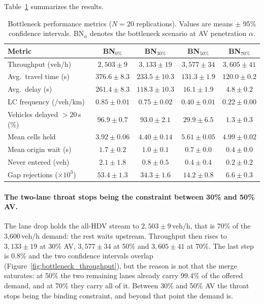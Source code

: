 \documentclass[review,authoryear]{elsarticle}
\begin{document}
Table~\ref{tab:results_bottleneck} summarizes the results.

\begin{table}[ht]
\centering
\caption{Bottleneck performance metrics ($N = 20$ replications). Values are means $\pm$ 95\% confidence intervals. BN$_\alpha$ denotes the bottleneck scenario at AV penetration $\alpha$.}
\label{tab:results_bottleneck}
\begin{tabular}{@{}lcccc@{}}
\toprule
Metric & BN$_{0\%}$ & BN$_{30\%}$ & BN$_{50\%}$ & BN$_{70\%}$ \\
\midrule
Throughput (veh/h) & $2{,}503 \pm 9$ & $3{,}133 \pm 19$ & $3{,}577 \pm 34$ & $3{,}605 \pm 41$ \\
Avg.\ travel time (s) & $376.6 \pm 8.3$ & $233.5 \pm 10.3$ & $131.3 \pm 1.9$ & $120.0 \pm 0.2$ \\
Avg.\ delay (s) & $261.4 \pm 8.3$ & $118.3 \pm 10.3$ & $16.1 \pm 1.9$ & $4.8 \pm 0.2$ \\
LC frequency (/veh/km) & $0.85 \pm 0.01$ & $0.75 \pm 0.02$ & $0.40 \pm 0.01$ & $0.22 \pm 0.00$ \\
Vehicles delayed $>20$\,s (\%) & $96.9 \pm 0.7$ & $93.0 \pm 2.1$ & $29.9 \pm 6.5$ & $1.3 \pm 0.3$ \\
Mean cells held & $3.92 \pm 0.06$ & $4.40 \pm 0.14$ & $5.61 \pm 0.05$ & $4.99 \pm 0.02$ \\
Mean origin wait (s) & $1.7 \pm 0.2$ & $1.0 \pm 0.1$ & $0.7 \pm 0.0$ & $0.4 \pm 0.0$ \\
Never entered (veh) & $2.1 \pm 1.8$ & $0.8 \pm 0.5$ & $0.4 \pm 0.4$ & $0.2 \pm 0.2$ \\
Gap rejections ($\times 10^3$) & $53.4 \pm 1.3$ & $34.3 \pm 1.6$ & $14.2 \pm 0.8$ & $6.6 \pm 0.3$ \\
\bottomrule
\end{tabular}
\end{table}

\paragraph{The two-lane throat stops being the constraint between 30\% and 50\% AV.}
The lane drop holds the all-HDV stream to $2{,}503 \pm 9$\,veh/h, that is 70\% of the 3{,}600\,veh/h demand: the rest waits upstream. Throughput then rises to $3{,}133 \pm 19$ at 30\% AV, $3{,}577 \pm 34$ at 50\% and $3{,}605 \pm 41$ at 70\%. The last step is 0.8\% and the two confidence intervals overlap (Figure~\ref{fig:bottleneck_throughput}), but the reason is not that the merge saturates: at 50\% the two remaining lanes already carry 99.4\% of the offered demand, and at 70\% they carry all of it. Between 30\% and 50\% AV the throat stops being the binding constraint, and beyond that point the demand is.
\end{document}
